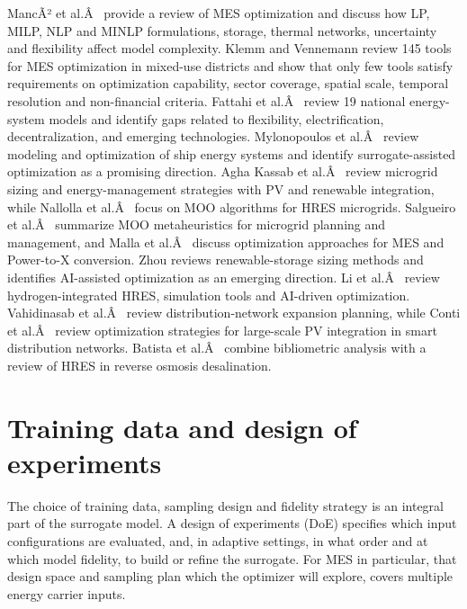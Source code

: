 \documentclass[final,5p,times,twocolumn]{elsarticle}
\begin{document}
MancÃ² et al.Â~\cite{Manco2024} provide a review of MES optimization and discuss how LP,
MILP, NLP and MINLP formulations, storage, thermal networks, uncertainty
and flexibility affect model complexity. Klemm and Vennemann \cite{Klemm2021} review 145 tools
for MES optimization in mixed-use districts and show that only few tools
satisfy requirements on optimization capability, sector coverage,
spatial scale, temporal resolution and non-financial criteria.
Fattahi et al.Â~\cite{Fattahi2020} review 19 national energy-system models and identify gaps
related to flexibility, electrification, decentralization, and emerging
technologies. Mylonopoulos et al.Â~\cite{Mylonopoulos202332697} review modeling and optimization
of ship energy systems and identify surrogate-assisted optimization as a
promising direction. Agha Kassab et al.Â~\cite{agha_kassab_comprehensive_2024} review microgrid
sizing and energy-management strategies with PV and renewable
integration, while Nallolla et al.Â~\cite{nallolla_multi-objective_2023} focus on MOO
algorithms for HRES microgrids. Salgueiro et
al.Â~\cite{salgueiro_multi-objective_2019}
summarize MOO metaheuristics for microgrid planning and management, and
Malla et al.Â~\cite{malla_sg_optimization_2024} discuss optimization approaches for MES
and Power-to-X conversion. Zhou \cite{Zhou2024__2} reviews renewable-storage
sizing methods and identifies AI-assisted optimization as an emerging
direction. Li et al.Â~\cite{Li2025_hydrogen} review hydrogen-integrated HRES,
simulation tools and AI-driven optimization.
Vahidinasab et al.Â~\cite{vahidinasab_overview_2020} review distribution-network expansion
planning, while Conti et al.Â~\cite{Conti2026} review optimization strategies for
large-scale PV integration in smart distribution networks.
Batista et al.Â~\cite{batista_optimizing_2023} combine bibliometric analysis with a review
of HRES in reverse osmosis desalination.

\section{Training data and design of experiments}
\label{sec:doe}

The choice of training data, sampling design and fidelity strategy is an
integral part of the surrogate model. A design of experiments (DoE)
specifies which input configurations are evaluated, and, in adaptive
settings, in what order and at which model fidelity, to build or refine
the surrogate. For MES in particular, that design space and sampling
plan which the optimizer will explore, covers multiple energy carrier
inputs.
\end{document}

